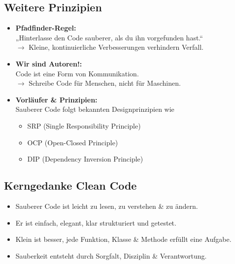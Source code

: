 \documentclass[12pt,a4paper,oneside]{article}
\begin{document}
\subsection{Weitere Prinzipien}

\begin{itemize}
\item \textbf{Pfadfinder-Regel:} \\
„Hinterlasse den Code sauberer, als du ihn vorgefunden hast.“ \\
$\rightarrow$ Kleine, kontinuierliche Verbesserungen verhindern Verfall.
\item \textbf{Wir sind Autoren!:} \\
Code ist eine Form von Kommunikation. \\
$\rightarrow$ Schreibe Code für Menschen, nicht für Maschinen.
\item \textbf{Vorläufer \& Prinzipien:} \\
Sauberer Code folgt bekannten Designprinzipien wie
\begin{itemize}
\item SRP (Single Responsibility Principle)
\item OCP (Open-Closed Principle)
\item DIP (Dependency Inversion Principle)
\end{itemize}
\end{itemize}

\subsection{Kerngedanke Clean Code}

\begin{itemize}
\item Sauberer Code ist leicht zu lesen, zu verstehen \& zu ändern.
\item Er ist einfach, elegant, klar strukturiert und getestet.
\item Klein ist besser, jede Funktion, Klasse \& Methode erfüllt eine Aufgabe.
\item Sauberkeit entsteht durch Sorgfalt, Disziplin \& Verantwortung.
\end{itemize}
\end{document}
